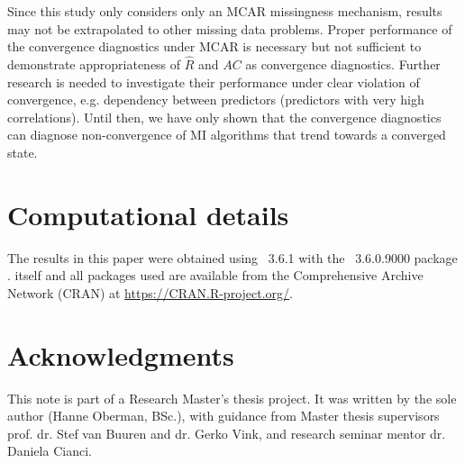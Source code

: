 \documentclass[article]{jss}
\begin{document}
Since this study only considers only an MCAR missingness mechanism, results may not be extrapolated to other missing data problems. Proper performance of the convergence diagnostics under MCAR is necessary but not sufficient to demonstrate appropriateness of $\widehat{R}$ and $AC$ as convergence diagnostics. %
Further research is needed to investigate their performance under clear violation of convergence, e.g. dependency between predictors (predictors with very high correlations). %
Until then, we have only shown that the convergence diagnostics can diagnose non-convergence of MI algorithms that trend towards a converged state.

\section*{Computational details}

The results in this paper were obtained using ~3.6.1 \cite{R} with the ~3.6.0.9000 package \cite{mice}.  itself and all packages used are available from the Comprehensive  Archive Network (CRAN) at \url{https://CRAN.R-project.org/}.


\section*{Acknowledgments}

This note is part of a Research Master's thesis project. It was written by the sole author (Hanne Oberman, BSc.), with guidance from Master thesis supervisors prof. dr. Stef van Buuren and dr. Gerko Vink, and research seminar mentor dr. Daniela Cianci. 


\end{document}
